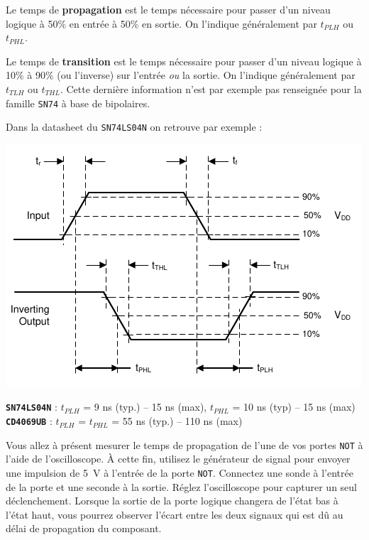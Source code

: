 \documentclass{../template/labo}
\begin{document}
{
	Le temps de \textbf{propagation} est le temps nécessaire pour passer d'un niveau logique à 50\% en entrée à 50\% en sortie. On l'indique généralement par $t_{PLH}$ ou $t_{PHL}$.

	Le temps de \textbf{transition} est le temps nécessaire pour passer d'un niveau logique à 10\% à 90\% (ou l'inverse) sur l'entrée \textit{ou} la sortie. On l'indique généralement par $t_{TLH}$ ou $t_{THL}$.
	Cette dernière information n'est par exemple pas renseignée pour la famille \texttt{SN74} à base de bipolaires.

	Dans la datasheet du \texttt{SN74LS04N} on retrouve par exemple :
	\begin{center}
	\includegraphics[width=.5\textwidth]{sn74ls04n-delays-graph.png}
	\end{center}


	\textbf{\texttt{SN74LS04N}} : $t_{PLH}$ = 9 ns (typ.) -- 15 ns (max), $t_{PHL}$ = 10 ns (typ) -- 15 ns (max)
	\textbf{\texttt{CD4069UB}} : $t_{PLH}$ = $t_{PHL}$ = 55 ns (typ.) -- 110 ns (max)

	
}



Vous allez à présent mesurer le temps de propagation de l'une de vos portes \texttt{NOT} à l'aide de l'oscilloscope.
À cette fin, utilisez le générateur de signal pour envoyer une impulsion de 5~V à l'entrée de la porte \texttt{NOT}.
Connectez une sonde à l'entrée de la porte et une seconde à la sortie.
Réglez l'oscilloscope pour capturer un seul déclenchement.
Lorsque la sortie de la porte logique changera de l'état bas à l'état haut, vous pourrez observer l'écart entre les deux signaux qui est dû au délai de propagation du composant.
\end{document}

